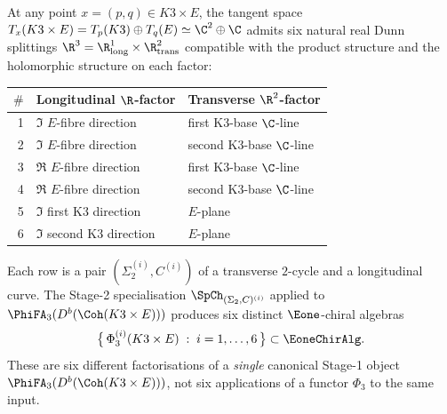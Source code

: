 \begin{proposition}
\label{prop:six-sigma-c-specialisations}
At any point $x = (p, q) \in K3 \times E$, the tangent space $T_x(K3 \times E) = T_p(K3) \oplus T_q(E) \simeq \C^2 \oplus \C$ admits six natural real Dunn splittings $\R^3 = \R^1_{\mathrm{long}} \times \R^2_{\mathrm{trans}}$ compatible with the product structure and the holomorphic structure on each factor:
\begin{center}
\renewcommand{\arraystretch}{1.2}
\begin{tabular}{rll}
 \toprule
 $\#$ & Longitudinal $\R$-factor & Transverse $\R^2$-factor \\
 \midrule
 1 & $\Im$ $E$-fibre direction & first K3-base $\C$-line \\
 2 & $\Im$ $E$-fibre direction & second K3-base $\C$-line \\
 3 & $\Re$ $E$-fibre direction & first K3-base $\C$-line \\
 4 & $\Re$ $E$-fibre direction & second K3-base $\C$-line \\
 5 & $\Im$ first K3 direction & $E$-plane \\
 6 & $\Im$ second K3 direction & $E$-plane \\
 \bottomrule
\end{tabular}
\end{center}
Each row is a pair $(\Sigma_2^{(i)}, C^{(i)})$ of a transverse $2$-cycle and a longitudinal curve. The Stage-2 specialisation $\SpCh_{(\Sigma_2, C)^{(i)}}$ applied to $\PhiFA_3(D^b(\Coh(K3 \times E)))$ produces six distinct $\Eone$-chiral algebras
\[
 \bigl\{\,\Phi_3^{(i)}(K3 \times E) \;:\; i = 1, \ldots, 6\,\bigr\}
 \subset \EoneChirAlg.
\]
These are six different factorisations of a \emph{single} canonical Stage-1 object $\PhiFA_3(D^b(\Coh(K3 \times E)))$, not six applications of a functor $\Phi_3$ to the same input.
\end{proposition}

